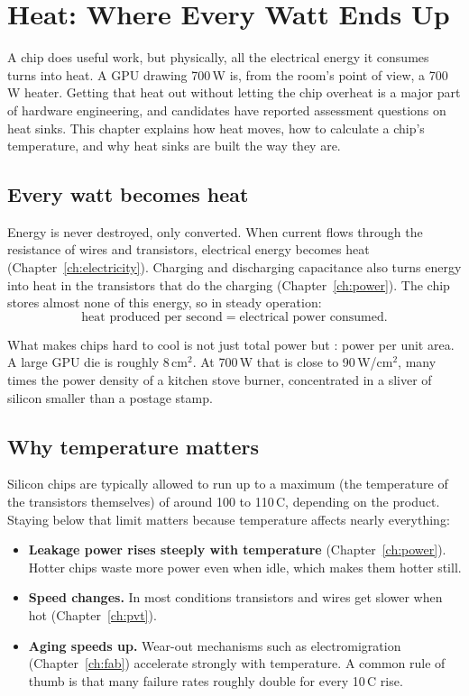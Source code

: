 \chapter{Heat: Where Every Watt Ends Up}
\label{ch:heat}

A chip does useful work, but physically, all the electrical energy it consumes turns into heat. A GPU drawing 700\,W is, from the room's point of view, a 700\,W heater. Getting that heat out without letting the chip overheat is a major part of hardware engineering, and candidates have reported assessment questions on heat sinks. This chapter explains how heat moves, how to calculate a chip's temperature, and why heat sinks are built the way they are.

\section{Every watt becomes heat}

Energy is never destroyed, only converted. When current flows through the resistance of wires and transistors, electrical energy becomes heat (Chapter~\ref{ch:electricity}). Charging and discharging capacitance also turns energy into heat in the transistors that do the charging (Chapter~\ref{ch:power}). The chip stores almost none of this energy, so in steady operation:
\[
  \text{heat produced per second} = \text{electrical power consumed}.
\]

What makes chips hard to cool is not just total power but : power per unit area. A large GPU die is roughly 8\,cm$^2$. At 700\,W that is close to 90\,W/cm$^2$, many times the power density of a kitchen stove burner, concentrated in a sliver of silicon smaller than a postage stamp.

\section{Why temperature matters}

Silicon chips are typically allowed to run up to a maximum  (the temperature of the transistors themselves) of around 100 to 110\,\textdegree C, depending on the product. Staying below that limit matters because temperature affects nearly everything:

\begin{itemize}
  \item \textbf{Leakage power rises steeply with temperature} (Chapter~\ref{ch:power}). Hotter chips waste more power even when idle, which makes them hotter still.
  \item \textbf{Speed changes.} In most conditions transistors and wires get slower when hot (Chapter~\ref{ch:pvt}).
  \item \textbf{Aging speeds up.} Wear-out mechanisms such as electromigration (Chapter~\ref{ch:fab}) accelerate strongly with temperature. A common rule of thumb is that many failure rates roughly double for every 10\,\textdegree C rise.
\end{itemize}


